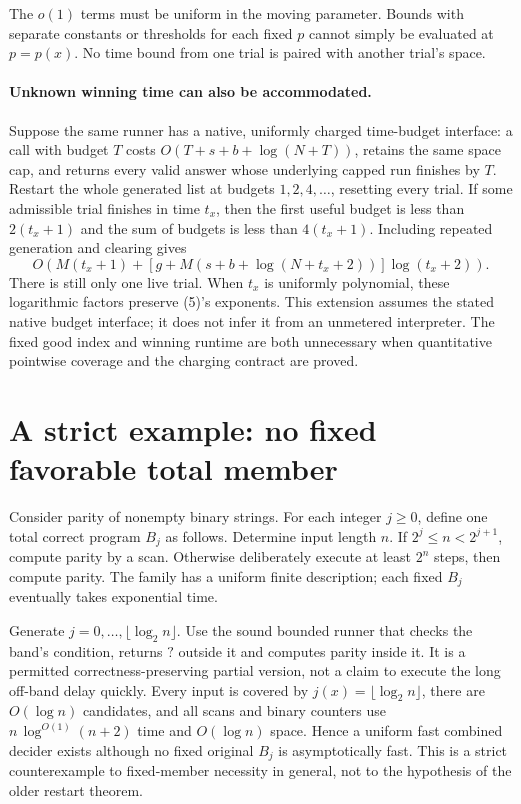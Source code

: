 \documentclass[11pt]{article}
\begin{document}
The $o(1)$ terms must be uniform in the moving parameter. Bounds with separate
constants or thresholds for each fixed $p$ cannot simply be evaluated at
$p=p(x)$. No time bound from one trial is paired with another trial's space.


\paragraph{Unknown winning time can also be accommodated.}
Suppose the same runner has a native, uniformly charged time-budget interface:
a call with budget $T$ costs $O(T+s+b+\log(N+T))$, retains the same space cap,
and returns every valid answer whose underlying capped run finishes by $T$.
Restart the whole generated list at budgets $1,2,4,\ldots$, resetting every
trial. If some admissible trial finishes in time $t_x$, then the first useful
budget is less than $2(t_x+1)$ and the sum of budgets is less than
$4(t_x+1)$. Including repeated generation and clearing gives
\[
 O\!\left(M(t_x+1)+
 [g+M(s+b+\log(N+t_x+2))]\log(t_x+2)\right).             \tag{8}
\]
There is still only one live trial. When $t_x$ is uniformly polynomial, these
logarithmic factors preserve (5)'s exponents. This extension assumes the
stated native budget interface; it does not infer it from an unmetered
interpreter. The fixed good index and winning runtime are both unnecessary
when quantitative pointwise coverage and the charging contract are proved.

\section{A strict example: no fixed favorable total member}
Consider parity of nonempty binary strings. For each integer $j\ge0$, define
one total correct program $B_j$ as follows. Determine input length $n$.
If $2^j\le n<2^{j+1}$, compute parity by a scan. Otherwise deliberately
execute at least $2^n$ steps, then compute parity. The family has a uniform
finite description; each fixed $B_j$ eventually takes exponential time.

Generate $j=0,\ldots,\lfloor\log_2 n\rfloor$. Use the sound bounded runner
that checks the band's condition, returns $?$ outside it and computes parity
inside it. It is a permitted correctness-preserving partial version, not a
claim to execute the long off-band delay quickly. Every input is covered by
$j(x)=\lfloor\log_2 n\rfloor$, there are $O(\log n)$ candidates, and all
scans and binary counters use $n\,\log^{O(1)}(n+2)$ time and $O(\log n)$ space.
Hence a uniform fast combined decider exists although no fixed original
$B_j$ is asymptotically fast. This is a strict counterexample to fixed-member
necessity in general, not to the hypothesis of the older restart theorem.
\end{document}
